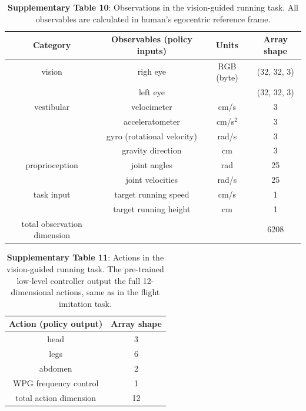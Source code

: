 \documentclass[sn-mathphys-num]{sn-jnl}%
\theoremstyle{thmstyleone}%
\theoremstyle{thmstyletwo}%
\theoremstyle{thmstylethree}%
\begin{document}
\begin{appendices}
\begin{table}[htbp]
	\centering
	\small
	\caption{\textbf{Supplementary Table 10}: 
		Observations in the vision-guided running task. 
		All observables are calculated in human's egocentric reference frame.
	}
	\begin{tabular}{cccc}
		\toprule
		\textbf{Category}         &        \textbf{Observables (policy inputs)}  & \textbf{Units}  & \textbf{Array shape}  \\
		\midrule
		vision     &   righ eye     &  RGB (byte)  & (32, 32, 3)  \\
		     &   left eye     &    & (32, 32, 3)  \\
		\midrule
		vestibular     &   velocimeter     &  cm/s  & 3  \\
		     &   acceleratometer     &  cm/s$ ^2 $  & 3  \\
		     &   gyro (rotational velocity)     &  rad/s  & 3  \\
		     &   gravity direction     &  cm  & 3  \\
		\midrule
		proprioception     &   joint angles     &  rad  & 25  \\
		     &   joint velocities     &  rad/s  & 25  \\
		\midrule
		task input     &   target running speed     &  cm/s  & 1  \\
		     &   target running height     &  cm  & 1  \\
		\midrule
		total observation dimension     &        &    & 6208  \\
		\bottomrule
	\end{tabular}%
	\label{tab:s_10}%
\end{table}%



\begin{table}[htbp]
	\centering
	\small
	\caption{\textbf{Supplementary Table 11}: 
		Actions in the vision-guided running task.
		The pre-trained low-level controller output the full 12-dimensional actions, same as in the flight imitation task.
	}
	\begin{tabular}{cc}
		\toprule
		Action (policy output)         &        Array shape    \\
		\midrule
		head     &  3        \\
		legs     &  6        \\
		abdomen     &  2        \\
		WPG frequency control     &  1        \\
		\midrule
		total action dimension     &  12        \\
		\bottomrule
	\end{tabular}%
	\label{tab:s_11}%
\end{table}%




\end{appendices}
\end{document}
